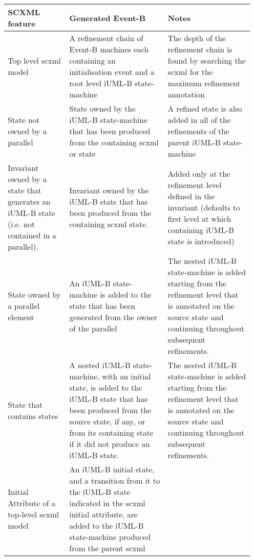 \begin{EventBNoShortInline}
  \begin{table}[]
	\centering
	\begin{tabular}{@{}p{0.25\linewidth}p{0.4\linewidth}p{0.35\linewidth}@{}}
		\hline
		\textbf{SCXML feature} & \textbf{Generated Event-B} & \textbf{Notes} 
		\\\midrule
		Top level scxml model &
		A refinement chain of Event-B machines each containing an initialisation event and a root level iUML-B state-machine &
		The depth of the refinement chain is found by searching the scxml for the maximum refinement annotation
		\\\hline
		State not owned by a parallel & 
		State owned by the iUML-B state-machine that has been produced from the containing scxml or state &
		A refined state is also added in all of the refinements of the parent iUML-B state-machine 
		\\\hline
		Invariant owned by a state that generates an iUML-B state (i.e. not contained in a parallel). &
		Invariant owned by the iUML-B state that has been produced from the containing scxml state. &
		Added only at the refinement level defined in the invariant (defaults to first level at which containing iUML-B state is introduced)
		\\\hline
		State owned by a parallel element &
		An iUML-B state-machine is added to the state that has been generated from the owner of the parallel &
		The nested iUML-B state-machine is added starting from the refinement level that is annotated on the source state and continuing throughout subsequent refinements.
		\\\hline
		State that contains states &
		A nested iUML-B state-machine, with an initial state, is added to the iUML-B state that has been produced from the source state, if any, or from its containing state if it did not produce an iUML-B state. &
		The nested iUML-B state-machine is added starting from the refinement level that is annotated on the source state and continuing throughout subsequent refinements.
		\\\hline
		Initial Attribute of a top-level scxml model &
		An iUML-B initial state, and a transition from it to the iUML-B state indicated in the scxml initial attribute, are added to the iUML-B state-machine produced from the parent scxml &

\end{tabular}
\end{table}
\end{EventBNoShortInline}
